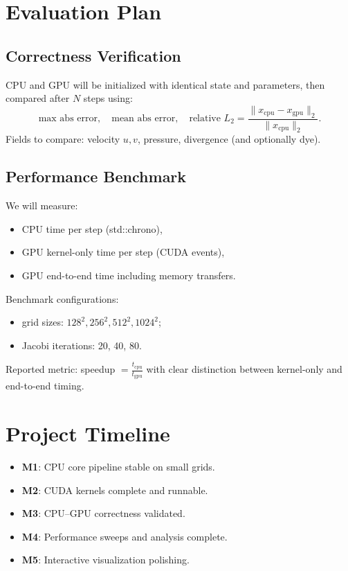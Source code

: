 \documentclass[10pt,a4paper]{article}
\begin{document}
\section{Evaluation Plan}
\subsection{Correctness Verification}
CPU and GPU will be initialized with identical state and parameters, then compared after $N$ steps using:
\[
\text{max abs error}, \quad \text{mean abs error}, \quad
\text{relative } L_2 = \frac{\|x_{\text{cpu}} - x_{\text{gpu}}\|_2}{\|x_{\text{cpu}}\|_2}.
\]
Fields to compare: velocity $u,v$, pressure, divergence (and optionally dye).

\subsection{Performance Benchmark}
We will measure:
\begin{itemize}
    \item CPU time per step (std::chrono),
    \item GPU kernel-only time per step (CUDA events),
    \item GPU end-to-end time including memory transfers.
\end{itemize}

Benchmark configurations:
\begin{itemize}
    \item grid sizes: $128^2, 256^2, 512^2, 1024^2$;
    \item Jacobi iterations: 20, 40, 80.
\end{itemize}

Reported metric: speedup $= \frac{t_{\text{cpu}}}{t_{\text{gpu}}}$ with clear distinction between kernel-only and end-to-end timing.

\section{Project Timeline}
\begin{itemize}
    \item \textbf{M1}: CPU core pipeline stable on small grids.
    \item \textbf{M2}: CUDA kernels complete and runnable.
    \item \textbf{M3}: CPU--GPU correctness validated.
    \item \textbf{M4}: Performance sweeps and analysis complete.
    \item \textbf{M5}: Interactive visualization polishing.
\end{itemize}
\end{document}
